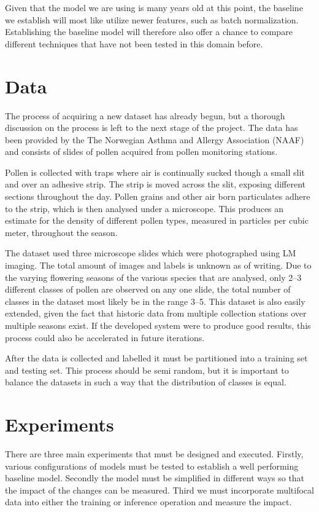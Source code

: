 Given that the model we are using is many years old at this point, the baseline we establish will most like utilize newer features, such as batch normalization.
Establishing the baseline model will therefore also offer a chance to compare different techniques that have not been tested in this domain before.

\section*{Data}
The process of acquiring a new dataset has already begun, but a thorough discussion on the process is left to the next stage of the project.
The data has been provided by the The Norwegian Asthma and Allergy Association (NAAF) and consists of slides of pollen acquired from pollen monitoring stations. 

Pollen is collected with traps where air is continually sucked though a small slit and over an adhesive strip.
The strip is moved across the slit, exposing different sections throughout the day.
Pollen grains and other air born particulates adhere to the strip, which is then analysed under a microscope.
This produces an estimate for the density of different pollen types, measured in particles per cubic meter, throughout the season. 

The dataset used three microscope slides which were photographed using LM imaging.
The total amount of images and labels is unknown as of writing.
Due to the varying flowering seasons of the various species that are analysed, only 2--3 different classes of pollen are observed on any one slide, the total number of classes in the dataset most likely be in the range 3--5.
This dataset is also easily extended, given the fact that historic data from multiple collection stations over multiple seasons exist.
If the developed system were to produce good results, this process could also be accelerated in future iterations.

After the data is collected and labelled it must be partitioned into a training set and testing set.
This process should be semi random, but it is important to balance the datasets in such a way that the distribution of classes is equal.

\section*{Experiments}
There are three main experiments that must be designed and executed.
Firstly, various configurations of models must be tested to establish a well performing baseline model.
Secondly the model must be simplified in different ways so that the impact of the changes can be measured.
Third we must incorporate multifocal data into either the training or inference operation and measure the impact.

